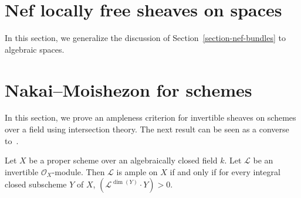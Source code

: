 \section{Nef locally free sheaves on spaces}
\label{section-nef-bundles-spaces}
In this section, we generalize the discussion of Section~\ref{section-nef-bundles}
to algebraic spaces.

\section{Nakai--Moishezon for schemes}
In this section, we prove an ampleness criterion for invertible sheaves on
schemes over a field using intersection theory.
The next result can be seen as a converse to~.

\begin{lemma}
\label{schemes-lemma-nakai-moishezon}
Let $X$ be a proper scheme over an algebraically closed field $k$.
Let $\mathcal{L}$ be an invertible $\mathcal{O}_X$-module.
Then $\mathcal{L}$ is ample on $X$ if and only if
for every integral closed subscheme $Y$ of $X$,
$(\mathcal{L}^{\dim(Y)} \cdot Y) > 0$.
\end{lemma}

